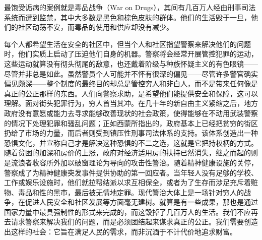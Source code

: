 \documentclass[fontset=fandol, a4paper, 12pt, openright]{ctexbook}
\begin{document}
最饱受诟病的案例就是毒品战争（War on Drugs），其间有几百万人经由刑事司法系统而遭到监禁，其中大多数是黑色和棕色皮肤的群体。他们的生活毁于一旦，他们的社区动荡不安，而毒品的使用和供应却没有减少。

每个人都希望生活在安全的社区中，但当个人和社区指望警察来解决他们的问题时，他们实质上启动了压迫他们自身的机器。警察将会经常开展管控犯罪的运动，这些运动就算没有彻头彻尾的敌意，也还戴着阶级与种族怀疑主义的有色眼镜——尽管并非总是如此。虽然警员个人可能并不怀有很深的偏见——尽管许多警官确实偏见颇深——整个制度的最终目的却总是管控穷人和非白人，而不是带来任何像是真正的公正那样的东西。人们向警察求助，是希望他们能提供安全和保障，这可以理解。面对街头犯罪行为，穷人首当其冲。在几十年的新自由主义紧缩之后，地方政府没有意愿或能力去寻求能够改善现状的社会政策，使得能够在不动用武装警察的情况下处理犯罪和骚乱问题；正如西蒙所指出的，政府基本上已经把贫穷的街区扔给了市场的力量，而后者则受到镇压性刑事司法体系的支持。该体系创造出一种恐惧文化，并宣称自己才是解决这种恐惧的不二之选，这就是它把持权柄的方式。随着贫困的加深和房价的上涨，政府对经济适用房的扶持已然消失，继之而起的则是流浪者收容所外加以破窗理论为导向的攻击性警治。随着精神健康设施的关停，警察成了为精神健康突发事件提供协助的第一回应者。当年轻人没有足够的学校、工作或娱乐设施时，他们就拉帮结派以求互相保全，或者为了生存而涉足充斥着赃物、毒品和性的黑市，最后被无情地定罪。现代警治大体上是一场针对穷人的战争，在促进人民安全和社区发展等方面毫无建树。就算是有一些成果，那也是通过国家力量中最具强制性的形式来完成的，而这毁掉了几百万人的生活。我们不应再去请求警察来解决我们的问题，而是必须团结起来谋求真正的公正。我们需要创造出这样的社会：它旨在满足人民的需求，而非沉湎于不计代价地追求财富。
\end{document}
